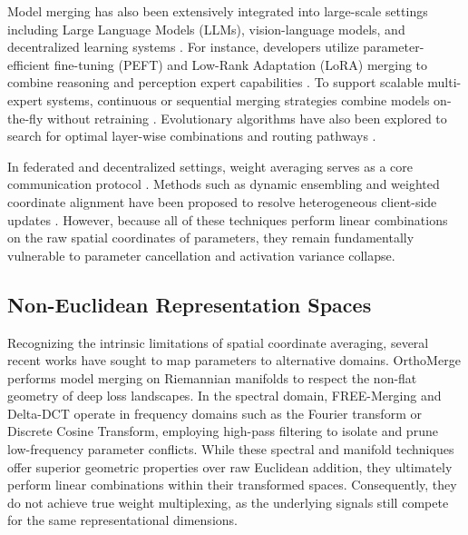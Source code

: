 \documentclass{article}
\begin{document}
Model merging has also been extensively integrated into large-scale settings including Large Language Models (LLMs), vision-language models, and decentralized learning systems \cite{devlin18_bert, radford21_clip, chen2025_bring, wu2025_unlocking}. For instance, developers utilize parameter-efficient fine-tuning (PEFT) and Low-Rank Adaptation (LoRA) merging to combine reasoning and perception expert capabilities \cite{zhang2025_lori, su2025_tensorized, cheng2025_whoever, li2025_model}. To support scalable multi-expert systems, continuous or sequential merging strategies combine models on-the-fly without retraining \cite{tang2025_merging, tang2024_merging, ueda2025_merging}. Evolutionary algorithms have also been explored to search for optimal layer-wise combinations and routing pathways \cite{akiba2024_evolutionary}.

In federated and decentralized settings, weight averaging serves as a core communication protocol \cite{linsner2021_approaches, chen2022_federated, rajangam2021_performance}. Methods such as dynamic ensembling and weighted coordinate alignment have been proposed to resolve heterogeneous client-side updates \cite{chen2022_dynamic, chaudhary2021_ensemble, galvão2025_optimizing, pala2024_dellamerging, yadav2024_what, tidey2018_merging, xu2025_zjuklab, wang2025_model, kodali2025_adapting, zhang2025_residential}. However, because all of these techniques perform linear combinations on the raw spatial coordinates of parameters, they remain fundamentally vulnerable to parameter cancellation and activation variance collapse.

\subsection{Non-Euclidean Representation Spaces}
Recognizing the intrinsic limitations of spatial coordinate averaging, several recent works have sought to map parameters to alternative domains. OrthoMerge \cite{yang26_orthomerge} performs model merging on Riemannian manifolds to respect the non-flat geometry of deep loss landscapes. In the spectral domain, FREE-Merging \cite{zheng24_freemerging} and Delta-DCT \cite{huang25_deltadct} operate in frequency domains such as the Fourier transform or Discrete Cosine Transform, employing high-pass filtering to isolate and prune low-frequency parameter conflicts. While these spectral and manifold techniques offer superior geometric properties over raw Euclidean addition, they ultimately perform linear combinations within their transformed spaces. Consequently, they do not achieve true weight multiplexing, as the underlying signals still compete for the same representational dimensions.
\end{document}
